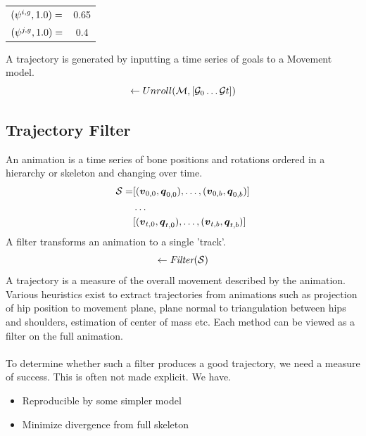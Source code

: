 \begin{center}
 \begin{tabular}{c c} 
 $(\psi^{i,g},1.0)=$ & 0.65\\ 
 $(\psi^{j,g},1.0)=$ & 0.4\\ 
\end{tabular}
\end{center}

A trajectory is generated by inputting a time series of goals to a Movement model.
\begin{equation}
    [\vec{v}_0,\quat{q}_0 \dots \vec{v}_t,\quat{q}_t] \leftarrow Unroll(\model,[\goals_{0} \dots \goals{t}])
\end{equation}

\subsection{Trajectory Filter}
An animation is a time series of bone positions and rotations ordered in a hierarchy or skeleton and changing over time.  
\begin{subequations}
\begin{align}    
    \mathcal{S}=&[(\boldsymbol{v }_{0,0},\boldsymbol{q }_{0,0}), \dots, (\boldsymbol{v }_{0,b},\boldsymbol{q }_{0,b})]\\
        &\dots \\
            &[(\boldsymbol{v }_{t,0},\boldsymbol{q }_{t,0}), \dots, (\boldsymbol{v }_{t,b},\boldsymbol{q }_{t,b})]
\end{align}    
\end{subequations}
A filter transforms an animation to a single 'track'. 
\begin{equation}
    [\vec{v}_0,\quat{q}_0 \dots \vec{v}_t,\quat{q}_t] \leftarrow \ffunc(\skeleton)
\end{equation}
A trajectory is a measure of the overall movement described by the animation. Various heuristics exist to extract trajectories from animations such as projection of hip position to movement plane, plane normal to triangulation between hips and shoulders, estimation of center of mass etc. Each method can be viewed as a filter on the full animation.\\\\
To determine whether such a filter produces a good trajectory, we need a measure of success. This is often not made explicit. We have.
\begin{itemize}
    \item Reproducible by some simpler model
    \item Minimize divergence from full skeleton 
\end{itemize}
